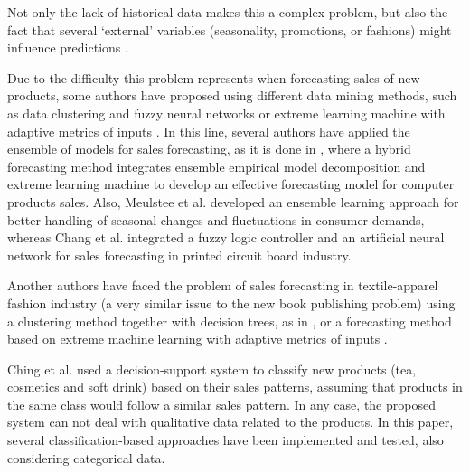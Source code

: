 \documentclass[a4paper,10pt,onecolumn,preprint,3p]{elsarticle}
\begin{document}
Not only the lack of historical data makes this a complex problem, but also the fact that several `external' variables (seasonality, promotions, or fashions) might influence predictions
\cite{Lapide1999,Thomassey2012,Xia2012,SThomassey2014,ChernWSF15}.

Due to the difficulty this problem represents when forecasting sales of new 
products, some authors have proposed using different data mining methods, such as data clustering and fuzzy neural networks \cite{Chang2009} or extreme learning machine with adaptive metrics of inputs \cite{Xia2012}.
In this line, several authors have applied the ensemble of models for sales forecasting, 
as it is done in \cite{ChiJie2012}, where a hybrid forecasting method integrates ensemble empirical model decomposition and extreme learning machine 
to develop an effective forecasting model for computer products sales.
Also, Meulstee et al. \cite{Meulstee2008} developed an ensemble learning approach for better handling of seasonal changes and fluctuations in consumer demands, whereas Chang et al. \cite{Chang2006715} integrated a fuzzy logic controller and an artificial neural network for sales forecasting in printed circuit board industry.

Another authors have faced the problem of sales forecasting in textile-apparel 
fashion industry (a very similar issue to the new book publishing problem) 
using a clustering method together with decision trees, as in \cite{SThomassey2014},  or a forecasting method based on extreme machine learning with adaptive metrics of inputs \cite{Xia2012}.

Ching et al. \cite{ChingChin2010} used a decision-support system to classify new 
products (tea, cosmetics and soft drink) based on their sales patterns, assuming 
that products in the same class would follow a similar sales pattern. 
In any case, the proposed system can not deal with qualitative data related to the products. 
In this paper, several classification-based approaches have been implemented and tested, also considering categorical data.


\end{document}
